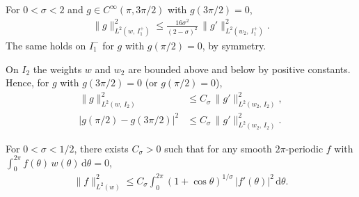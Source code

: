\documentclass[10pt,a4paper]{amsart}
\begin{document}
\begin{lemma}\label{lem:hardy}
For $0 < \sigma < 2$ and $g \in C^\infty(\pi, 3\pi/2)$ with $g(3\pi/2) = 0$,
\begin{align}
    \|g\|_{L^2(w,\, I_1^+)}^2 \leq \frac{16\sigma^2}{(2-\sigma)^2}\, \|g'\|_{L^2(w_2,\, I_1^+)}^2.
\end{align}
The same holds on $I_1^-$ for $g$ with $g(\pi/2) = 0$, by symmetry.
\end{lemma}

\begin{lemma}\label{lem:poincare}
On $I_2$ the weights $w$ and $w_2$ are bounded above and below by positive constants. Hence, for $g$ with $g(3\pi/2) = 0$ (or $g(\pi/2)=0$),
\begin{align}
    \|g\|_{L^2(w,\,I_2)}^2 &\leq C_\sigma\, \|g'\|_{L^2(w_2,\,I_2)}^2, \\
    |g(\pi/2) - g(3\pi/2)|^2 &\leq C_\sigma\, \|g'\|_{L^2(w_2,\,I_2)}^2.
\end{align}
\end{lemma}

\begin{theorem}\label{thm:gap}
For $0 < \sigma < 1/2$, there exists $C_\sigma > 0$ such that for any smooth $2\pi$-periodic $f$ with $\int_0^{2\pi} f(\theta)\, w(\theta)\, \mathrm{d}\theta = 0$,
\begin{align}
    \|f\|_{L^2(w)}^2 \leq C_\sigma \int_0^{2\pi} (1+\cos\theta)^{1/\sigma}\, |f'(\theta)|^2\, \mathrm{d}\theta.
\end{align}
\end{theorem}
\end{document}
